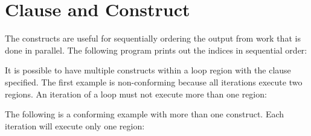 \pagebreak
\section{ Clause and  Construct}
\label{sec:ordered}

The  constructs  are useful for sequentially ordering the output from work that
is done in parallel. The following program prints out the indices in sequential 
order:



It is possible to have multiple  constructs within a loop region 
with the  clause specified. The first example is non-conforming 
because all iterations execute two  regions. An iteration of a 
loop must not execute more than one  region:



The following is a conforming example with more than one  construct. 
Each iteration will execute only one  region:



